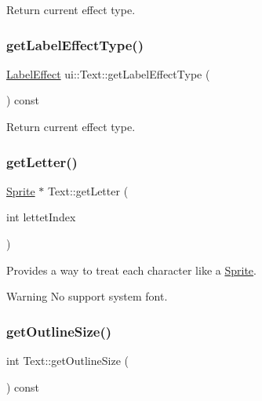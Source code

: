 Return current effect type. \mbox{\label{classui_1_1Text_a8befc76f2ea28668b29e1ba0c6ee6793}} 
\subsubsection{\texorpdfstring{get\+Label\+Effect\+Type()}{getLabelEffectType()}\hspace{0.1cm}{\footnotesize\ttfamily [2/2]}}
{\footnotesize\ttfamily \hyperlink{group__base_ga26fd049ca5303e0cf4435208058f32e4}{Label\+Effect} ui\+::\+Text\+::get\+Label\+Effect\+Type (\begin{DoxyParamCaption}{ }\end{DoxyParamCaption}) const}

Return current effect type. \mbox{\label{classui_1_1Text_ae4acdfb8c24dfbd9ebfaf0b9d9d0a00c}} 
\subsubsection{\texorpdfstring{get\+Letter()}{getLetter()}}
{\footnotesize\ttfamily \hyperlink{classSprite}{Sprite} $\ast$ Text\+::get\+Letter (\begin{DoxyParamCaption}\item[{int}]{lettet\+Index }\end{DoxyParamCaption})\hspace{0.3cm}{\ttfamily [virtual]}}

Provides a way to treat each character like a \hyperlink{classSprite}{Sprite}. \begin{DoxyWarning}{Warning}
No support system font. 
\end{DoxyWarning}
\mbox{\label{classui_1_1Text_a77a19a21a2950313a469b2021461a076}} 
\subsubsection{\texorpdfstring{get\+Outline\+Size()}{getOutlineSize()}\hspace{0.1cm}{\footnotesize\ttfamily [1/2]}}
{\footnotesize\ttfamily int Text\+::get\+Outline\+Size (\begin{DoxyParamCaption}{ }\end{DoxyParamCaption}) const}

